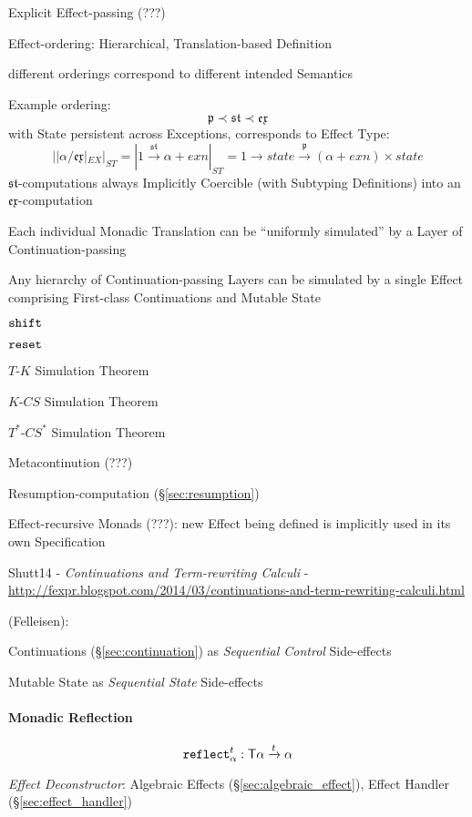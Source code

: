 Explicit Effect-passing (???)

Effect-ordering: Hierarchical, Translation-based Definition

different orderings correspond to different intended Semantics

Example ordering:
\[
\mathfrak{p} \prec \mathfrak{st} \prec \mathfrak{ex}
\]
with State persistent across Exceptions, corresponds to Effect Type:
\[
  ||\alpha / \mathfrak{ex}|_{EX}|_{ST} = |1
  \xrightarrow{\mathfrak{st}} \alpha + exn|_{ST} = 1 \rightarrow state
  \xrightarrow{\mathfrak{p}} (\alpha + exn) \times state
\]
$\mathfrak{st}$-computations always Implicitly Coercible (with
Subtyping Definitions) into an
$\mathfrak{ex}$-computation

Each individual Monadic Translation can be ``uniformly simulated'' by
a Layer of Continuation-passing

Any hierarchy of Continuation-passing Layers can be simulated by a
single Effect comprising First-class Continuations and Mutable State

$\mathtt{shift}$

$\mathtt{reset}$

$T$-$K$ Simulation Theorem

$K$-$CS$ Simulation Theorem

$T^*$-$CS^*$ Simulation Theorem

Metacontinution (???)

Resumption-computation (\S\ref{sec:resumption})

Effect-recursive Monads (???): new Effect being defined is implicitly
used in its own Specification


\asterism

Shutt14 - \emph{Continuations and Term-rewriting Calculi} -
\url{http://fexpr.blogspot.com/2014/03/continuations-and-term-rewriting-calculi.html}

(Felleisen):

Continuations (\S\ref{sec:continuation}) as \emph{Sequential Control}
Side-effects

Mutable State as \emph{Sequential State} Side-effects



\paragraph{Monadic Reflection}\label{sec:monadic_reflection}\hfill
\[
  \mathtt{reflect}_\alpha^t : \mathsf{T} \alpha \xrightarrow{t} \alpha
\]

\emph{Effect Deconstructor}: Algebraic Effects
(\S\ref{sec:algebraic_effect}), Effect Handler
(\S\ref{sec:effect_handler})



